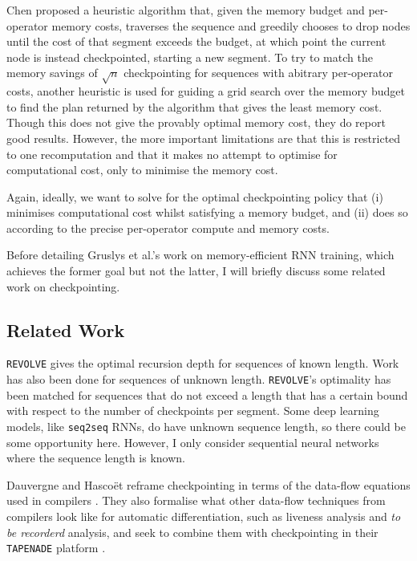 Chen proposed a heuristic algorithm that, given the memory budget and per-operator memory costs, traverses the sequence and greedily chooses to drop nodes until the cost of that segment exceeds the budget, at which point the current node is instead checkpointed, starting a new segment.
To try to match the memory savings of \(\sqrt{n}\) checkpointing for sequences with abitrary per-operator costs, another heuristic is used for guiding a grid search over the memory budget to find the plan returned by the algorithm that gives the least memory cost.
Though this does not give the provably optimal memory cost, they do report good results.
However, the more important limitations are that this is restricted to one recomputation and that it makes no attempt to optimise for computational cost, only to minimise the memory cost.

Again, ideally, we want to solve for the optimal checkpointing policy that (i) minimises computational cost whilst satisfying a memory budget, and (ii) does so according to the precise per-operator compute and memory costs. 

Before detailing Gruslys et al.'s \cite{Gruslys2016} work on memory-efficient RNN training, which achieves the former goal but not the latter, I will briefly discuss some related work on checkpointing.

\subsection{Related Work}
\texttt{REVOLVE} gives the optimal recursion depth for sequences of known length.
Work has also been done for sequences of unknown length.
\texttt{REVOLVE}'s optimality has been matched for sequences that do not exceed a length that has a certain bound with respect to the number of checkpoints per segment.
Some deep learning models, like \texttt{seq2seq} RNNs, do have unknown sequence length, so there could be some opportunity here.
However, I only consider sequential neural networks where the sequence length is known.

Dauvergne and Hasco\"{e}t reframe checkpointing in terms of the data-flow equations used in compilers \cite{Dauvergne2006}.
They also formalise what other data-flow techniques from compilers look like for automatic differentiation, such as liveness analysis and \textit{to be recorderd} analysis, and seek to combine them with checkpointing in their \texttt{TAPENADE} platform \cite{Hascoet2013-tapenade}.

